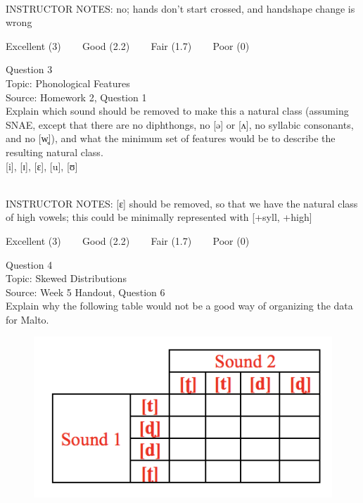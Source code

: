 \documentclass[12pt]{article}
\begin{document}
~\\
INSTRUCTOR NOTES: no; hands don't start crossed, and handshape change is wrong


\vfill
Excellent (3) ~~~ Good (2.2) ~~~ Fair (1.7) ~~~ Poor (0)
\newpage

{\large Question 3}\\

Topic: Phonological Features\\
Source: Homework 2, Question 1\\

Explain which sound should be removed to make this a natural class (assuming SNAE, except that there are no diphthongs, no [ə] or [ʌ], no syllabic consonants, and no [w̥]), and what the minimum set of features would be to describe the resulting natural class.\\

{[i]}, {[ɪ]}, {[ɛ]}, {[u]}, {[ʊ]}


~\\
INSTRUCTOR NOTES: [ɛ] should be removed, so that we have the natural class of high vowels; this could be minimally represented with [+syll, +high]


\vfill
Excellent (3) ~~~ Good (2.2) ~~~ Fair (1.7) ~~~ Poor (0)
\newpage

{\large Question 4}\\

Topic: Skewed Distributions\\
Source: Week 5 Handout, Question 6\\

Explain why the following table would not be a good way of organizing the data for Malto.\\

\begin{figure}[H]
\includegraphics{../images/Malto_table_bad.png}
\end{figure}
\end{document}
